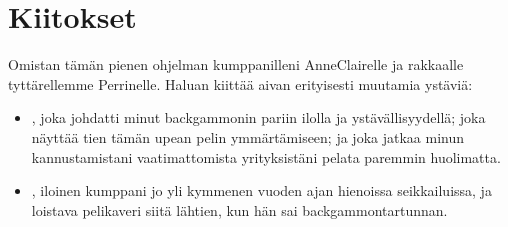 \documentclass[letterpaper,10pt,finnish]{sphinxmanual}
\begin{document}
\chapter{Kiitokset}
\label{\detokenize{index:remerciements}}
\sphinxAtStartPar
Omistan tämän pienen ohjelman kumppanilleni Anne\sphinxhyphen{}Clairelle ja rakkaalle tyttärellemme Perrinelle. Haluan kiittää aivan erityisesti muutamia ystäviä:
\begin{itemize}
\item {} 
\sphinxAtStartPar
{}, joka johdatti minut backgammonin pariin ilolla ja ystävällisyydellä; joka näyttää tien tämän upean pelin ymmärtämiseen; ja joka jatkaa minun kannustamistani vaatimattomista yrityksistäni pelata paremmin huolimatta.

\item {} 
\sphinxAtStartPar
{}, iloinen kumppani jo yli kymmenen vuoden ajan hienoissa seikkailuissa, ja loistava pelikaveri siitä lähtien, kun hän sai backgammon\sphinxhyphen{}tartunnan.

\end{itemize}



\renewcommand{\indexname}{Sisällysluettelo}
\printindex
\end{document}
